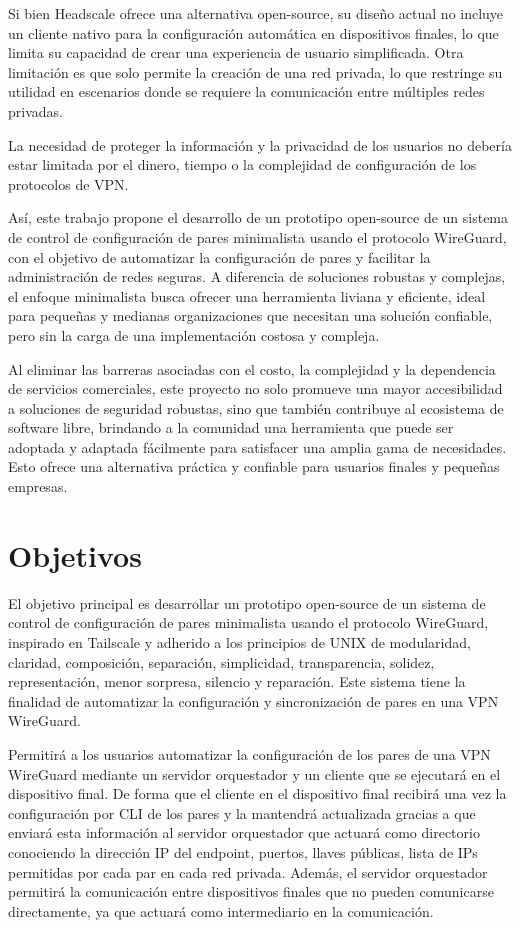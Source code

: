 \documentclass[letterpaper,12pt,oneside]{article}
\begin{document}
Si bien Headscale ofrece una alternativa open-source, su diseño actual no incluye un cliente nativo para la configuración automática en dispositivos finales, lo que limita su capacidad de crear una experiencia de usuario simplificada. Otra limitación es que solo permite la creación de una red privada, lo que restringe su utilidad en escenarios donde se requiere la comunicación entre múltiples redes privadas.

La necesidad de proteger la información y la privacidad de los usuarios no debería estar limitada por el dinero, tiempo o la complejidad de configuración de los protocolos de VPN.

Así, este trabajo propone el desarrollo de un prototipo open-source de un sistema de control de configuración de pares minimalista usando el protocolo WireGuard, con el objetivo de automatizar la configuración de pares y facilitar la administración de redes seguras. A diferencia de soluciones robustas y complejas, el enfoque minimalista busca ofrecer una herramienta liviana y eficiente, ideal para pequeñas y medianas organizaciones que necesitan una solución confiable, pero sin la carga de una implementación costosa y compleja.


Al eliminar las barreras asociadas con el costo, la complejidad y la dependencia de servicios comerciales, este proyecto no solo promueve una mayor accesibilidad a soluciones de seguridad robustas, sino que también contribuye al ecosistema de software libre, brindando a la comunidad una herramienta que puede ser adoptada y adaptada fácilmente para satisfacer una amplia gama de necesidades. Esto ofrece una alternativa práctica y confiable para usuarios finales y pequeñas empresas.


\section{Objetivos}

El objetivo principal es desarrollar un prototipo open-source de un sistema de control de configuración de pares minimalista usando el protocolo WireGuard, inspirado en Tailscale y adherido a los principios de UNIX de modularidad, claridad, composición, separación, simplicidad, transparencia, solidez, representación, menor sorpresa, silencio y reparación. Este sistema tiene la finalidad de automatizar la configuración y sincronización de pares en una VPN WireGuard.

Permitirá a los usuarios automatizar la configuración de los pares de una VPN WireGuard mediante un servidor orquestador y un cliente que se ejecutará en el dispositivo final. De forma que el cliente en el dispositivo final recibirá una vez la configuración por CLI de los pares y la mantendrá actualizada gracias a que enviará esta información al servidor orquestador que actuará como directorio conociendo la dirección IP del endpoint, puertos, llaves públicas, lista de IPs permitidas por cada par en cada red privada. Además, el servidor orquestador permitirá la comunicación entre dispositivos finales que no pueden comunicarse directamente, ya que actuará como intermediario en la comunicación.
\end{document}
